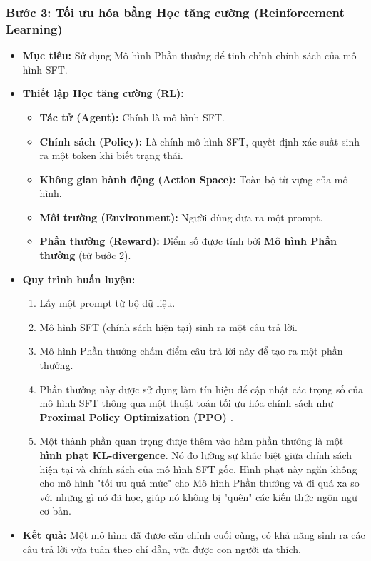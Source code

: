 \subsubsection{Bước 3: Tối ưu hóa bằng Học tăng cường (Reinforcement Learning)}
\begin{itemize}
    \item \textbf{Mục tiêu:} Sử dụng Mô hình Phần thưởng để tinh chỉnh chính sách của mô hình SFT.
    \item \textbf{Thiết lập Học tăng cường (RL):}
        \begin{itemize}
            \item \textbf{Tác tử (Agent):} Chính là mô hình SFT.
            \item \textbf{Chính sách (Policy):} Là chính mô hình SFT, quyết định xác suất sinh ra một token khi biết trạng thái.
            \item \textbf{Không gian hành động (Action Space):} Toàn bộ từ vựng của mô hình.
            \item \textbf{Môi trường (Environment):} Người dùng đưa ra một prompt.
            \item \textbf{Phần thưởng (Reward):} Điểm số được tính bởi \textbf{Mô hình Phần thưởng} (từ bước 2).
        \end{itemize}
    \item \textbf{Quy trình huấn luyện:}
        \begin{enumerate}
            \item Lấy một prompt từ bộ dữ liệu.
            \item Mô hình SFT (chính sách hiện tại) sinh ra một câu trả lời.
            \item Mô hình Phần thưởng chấm điểm câu trả lời này để tạo ra một phần thưởng.
            \item Phần thưởng này được sử dụng làm tín hiệu để cập nhật các trọng số của mô hình SFT thông qua một thuật toán tối ưu hóa chính sách như \textbf{Proximal Policy Optimization (PPO) \cite{schulman2017proximal}}.
            \item Một thành phần quan trọng được thêm vào hàm phần thưởng là một \textbf{hình phạt KL-divergence}. Nó đo lường sự khác biệt giữa chính sách hiện tại và chính sách của mô hình SFT gốc. Hình phạt này ngăn không cho mô hình "tối ưu quá mức" cho Mô hình Phần thưởng và đi quá xa so với những gì nó đã học, giúp nó không bị "quên" các kiến thức ngôn ngữ cơ bản.
        \end{enumerate}
    \item \textbf{Kết quả:} Một mô hình đã được căn chỉnh cuối cùng, có khả năng sinh ra các câu trả lời vừa tuân theo chỉ dẫn, vừa được con người ưa thích.
\end{itemize}

